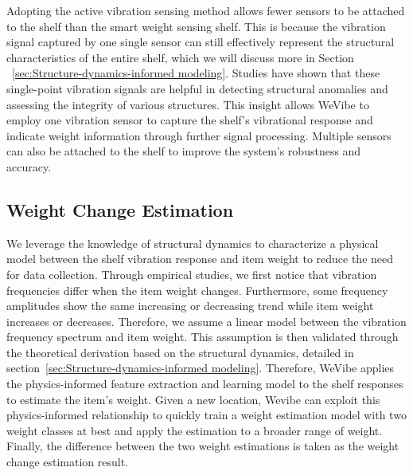 Adopting the active vibration sensing method allows fewer sensors to be attached to the shelf than the smart weight sensing shelf. This is because the vibration signal captured by one single sensor can still effectively represent the structural characteristics of the entire shelf, which we will discuss more in Section ~\ref{sec:Structure-dynamics-informed modeling}. Studies have shown that these single-point vibration signals are helpful in detecting structural anomalies and assessing the integrity of various structures\cite{sekiya2018simplified,obrien2020using,yu2016state}. This insight allows WeVibe to employ one vibration sensor to capture the shelf's vibrational response and indicate weight information through further signal processing. Multiple sensors can also be attached to the shelf to improve the system's robustness and accuracy.

\subsection{Weight Change Estimation}
\label{sec: Weight Change Estimation}
We leverage the knowledge of structural dynamics to characterize a physical model between the shelf vibration response and item weight to reduce the need for data collection. Through empirical studies, we first notice that vibration frequencies differ when the item weight changes. Furthermore, some frequency amplitudes show the same increasing or decreasing trend while item weight increases or decreases. Therefore, we assume a linear model between the vibration frequency spectrum and item weight. This assumption is then validated through the theoretical derivation based on the structural dynamics, detailed in section~\ref{sec:Structure-dynamics-informed modeling}. Therefore, WeVibe applies the physics-informed feature extraction and learning model to the shelf responses to estimate the item's weight. Given a new location, Wevibe can exploit this physics-informed relationship to quickly train a weight estimation model with two weight classes at best and apply the estimation to a broader range of weight. Finally, the difference between the two weight estimations is taken as the weight change estimation result.


